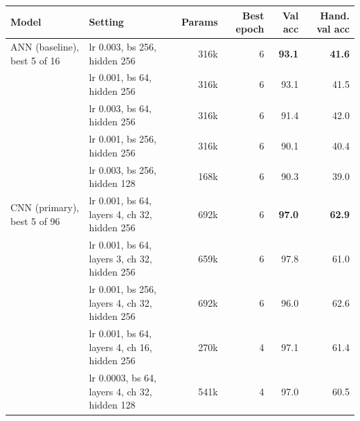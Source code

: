 \begin{tabular}{llrrrr}
\toprule
Model & Setting & Params & Best epoch & Val acc & Hand. val acc \\
\midrule
ANN (baseline), best 5 of 16 & lr 0.003, bs 256, hidden 256 & 316k & 6 & \textbf{93.1} & \textbf{41.6} \\
 & lr 0.001, bs 64, hidden 256 & 316k & 6 & 93.1 & 41.5 \\
 & lr 0.003, bs 64, hidden 256 & 316k & 6 & 91.4 & 42.0 \\
 & lr 0.001, bs 256, hidden 256 & 316k & 6 & 90.1 & 40.4 \\
 & lr 0.003, bs 256, hidden 128 & 168k & 6 & 90.3 & 39.0 \\
\midrule
CNN (primary), best 5 of 96 & lr 0.001, bs 64, layers 4, ch 32, hidden 256 & 692k & 6 & \textbf{97.0} & \textbf{62.9} \\
 & lr 0.001, bs 64, layers 3, ch 32, hidden 256 & 659k & 6 & 97.8 & 61.0 \\
 & lr 0.001, bs 256, layers 4, ch 32, hidden 256 & 692k & 6 & 96.0 & 62.6 \\
 & lr 0.001, bs 64, layers 4, ch 16, hidden 256 & 270k & 4 & 97.1 & 61.4 \\
 & lr 0.0003, bs 64, layers 4, ch 32, hidden 128 & 541k & 4 & 97.0 & 60.5 \\
\bottomrule
\end{tabular}

